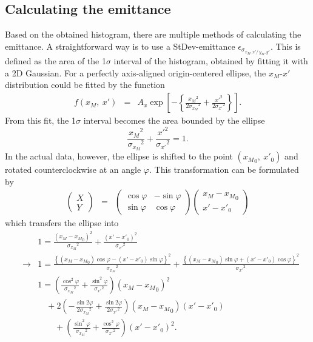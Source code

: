 \documentclass{article}
\begin{document}
\subsection{Calculating the emittance}
Based on the obtained histogram, there are multiple methods of calculating the emittance. A straightforward way is to use a StDev-emittance $\epsilon_{\sigma_{x_M,x'/\ y_M,y'}}$. This is defined as the area of the 1$\sigma$ interval of the histogram, obtained by fitting it with a 2D Gaussian. For a perfectly axis-aligned origin-centered ellipse, the $x_M$-$x'$ distribution could be fitted by the function
\begin{eqnarray*}
f(x_M,\ x') & = & A_x \exp{\left[ -\left\{ \frac{{x_M}^2}{2{\sigma_{x_M}}^2} + \frac{{x'}^2}{2{\sigma_{x'}}^2} \right\}\right]}.
\end{eqnarray*}
From this fit, the 1$\sigma$ interval becomes the area bounded by the ellipse 
\begin{equation*}
\frac{{x_M}^2}{{\sigma_{x_M}}^2} + \frac{{x'}^2}{{\sigma_{x'}}^2} = 1.
\end{equation*}
In the actual data, however, the ellipse is shifted to the point $\left({x_M}_0,\ {x'}_0\right)$ and rotated counterclockwise at an angle $\varphi$. This transformation can be formulated by
\begin{eqnarray*}
\left(
\begin{array}{c}
	X \\
	Y
\end{array} \right) & = & \left(
\begin{array}{cc}
	\cos{\varphi} & -\sin{\varphi} \\
	\sin{\varphi} & \cos{\varphi}
\end{array} \right) \left(
\begin{array}{c}
	x_M - {x_M}_0 \\
	x' - {x'}_0
\end{array} \right)
\end{eqnarray*}
which transfers the ellipse into
\begin{eqnarray*}
& & 1 = \frac{\left(x_M-{x_M}_0\right)^2}{{\sigma_{x_M}}^2} + \frac{\left(x'-{x'}_0\right)^2}{{\sigma_{x'}}^2} \\
& \rightarrow & 1 = \frac{\left\{ \left(x_M-{x_M}_0\right)\cos{\varphi} - \left(x'-{x'}_0\right)\sin{\varphi} \right\}^2}{{\sigma_{x_M}}^2} + \frac{\left\{ \left(x_M-{x_M}_0\right)\sin{\varphi} + \left(x'-{x'}_0\right)\cos{\varphi} \right\}^2}{{\sigma_{x'}}^2} \\
& & 1 = \left( \frac{\cos^2{\varphi}}{{\sigma_{x_M}}^2} + \frac{\sin^2{\varphi}}{{\sigma_{x'}}^2} \right) \left( x_M-{x_M}_0 \right)^2 \\
& & \, \, \, \, \, \, + 2 \left( -\frac{\sin{2\varphi}}{2{\sigma_{x_M}}^2} + \frac{\sin{2\varphi}}{2{\sigma_{x'}}^2} \right) \left( x_M-{x_M}_0 \right) \left( x'-{x'}_0 \right) \\
& & \, \, \, \, \, \, \, \, \, \, \, \, + \left( \frac{\sin^2{\varphi}}{{\sigma_{x_M}}^2} + \frac{\cos^2{\varphi}}{{\sigma_{x'}}^2} \right) \left( x'-{x'}_0 \right)^2 .
\end{eqnarray*}
\end{document}
